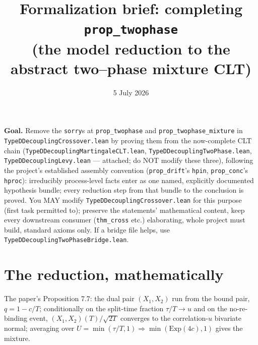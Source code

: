 \documentclass[11pt]{article}
\title{Formalization brief: completing \texttt{prop\_twophase}\\
(the model reduction to the abstract two--phase mixture CLT)}
\date{5 July 2026}
\theoremstyle{plain}
\theoremstyle{remark}
\begin{document}
\maketitle

\noindent\textbf{Goal.} Remove the \texttt{sorry}s at \texttt{prop\_twophase}
and \texttt{prop\_twophase\_mixture} in \texttt{TypeDDecouplingCrossover.lean}
by proving them from the now-complete CLT chain
(\texttt{TypeDDecouplingMartingaleCLT.lean},
\texttt{TypeDDecouplingTwoPhase.lean}, \texttt{TypeDDecouplingLevy.lean} ---
attached; do NOT modify these three), following the project's established
assembly convention (\texttt{prop\_drift}'s \texttt{hpin},
\texttt{prop\_conc}'s \texttt{hproc}): irreducibly process-level facts enter
as one named, explicitly documented hypothesis bundle; every reduction step
from that bundle to the conclusion is proved. You MAY modify
\texttt{TypeDDecouplingCrossover.lean} for this purpose (first task permitted
to); preserve the statements' mathematical content, keep every downstream
consumer (\texttt{thm\_cross} etc.) elaborating, whole project must build,
standard axioms only. If a bridge file helps, use
\texttt{TypeDDecouplingTwoPhaseBridge.lean}.

\section*{The reduction, mathematically}

The paper's Proposition 7.7: the dual pair $(X_1,X_2)$ run from the bound
pair, $q=1-c/T$; conditionally on the split-time fraction $\tau/T\to u$ and on
the no-re-binding event, $(X_1,X_2)(T)/\sqrt{2T}$ converges to the
correlation-$u$ bivariate normal; averaging over
$U=\min(\tau/T,1)\Rightarrow\min(\mathrm{Exp}(4c),1)$ gives the mixture.
\end{document}
